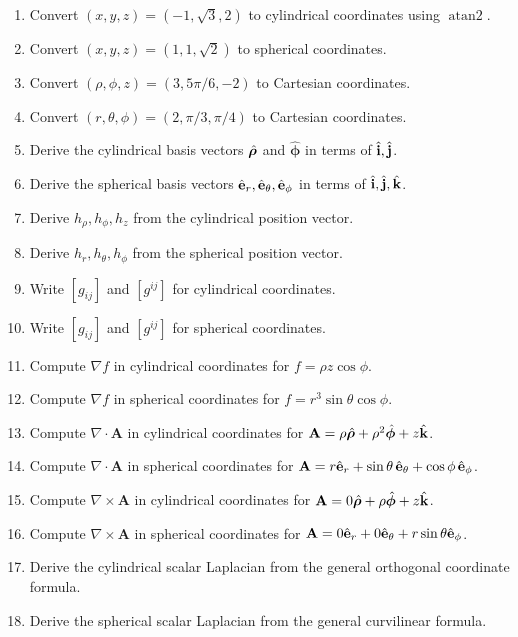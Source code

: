 \documentclass{otscience}
\begin{document}
\begin{practicebox}
\begin{enumerate}
\item Convert \((x,y,z)=(-1,\sqrt3,2)\) to cylindrical coordinates using \(\operatorname{atan2}\).
\item Convert \((x,y,z)=(1,1,\sqrt2)\) to spherical coordinates.
\item Convert \((\rho,\phi,z)=(3,5\pi/6,-2)\) to Cartesian coordinates.
\item Convert \((r,\theta,\phi)=(2,\pi/3,\pi/4)\) to Cartesian coordinates.
\item Derive the cylindrical basis vectors \(\hat{\boldsymbol{\rho}}\) and \(\hat{\boldsymbol{\phi}}\) in terms of \(\hat{\mathbf{i}},\hat{\mathbf{j}}\).
\item Derive the spherical basis vectors \(\hat{\mathbf{e}}_r,\hat{\mathbf{e}}_\theta,\hat{\mathbf{e}}_\phi\) in terms of \(\hat{\mathbf{i}},\hat{\mathbf{j}},\hat{\mathbf{k}}\).
\item Derive \(h_\rho,h_\phi,h_z\) from the cylindrical position vector.
\item Derive \(h_r,h_\theta,h_\phi\) from the spherical position vector.
\item Write \([g_{ij}]\) and \([g^{ij}]\) for cylindrical coordinates.
\item Write \([g_{ij}]\) and \([g^{ij}]\) for spherical coordinates.
\item Compute \(\nabla f\) in cylindrical coordinates for \(f=\rho z\cos\phi\).
\item Compute \(\nabla f\) in spherical coordinates for \(f=r^3\sin\theta\cos\phi\).
\item Compute \(\nabla\cdot\mathbf{A}\) in cylindrical coordinates for \(\mathbf{A}=\rho\hat{\boldsymbol{\rho}}+\rho^2\hat{\boldsymbol{\phi}}+z\hat{\mathbf{k}}\).
\item Compute \(\nabla\cdot\mathbf{A}\) in spherical coordinates for \(\mathbf{A}=r\hat{\mathbf{e}}_r+\sin\theta\,\hat{\mathbf{e}}_\theta+\cos\phi\,\hat{\mathbf{e}}_\phi\).
\item Compute \(\nabla\times\mathbf{A}\) in cylindrical coordinates for \(\mathbf{A}=0\hat{\boldsymbol{\rho}}+\rho\hat{\boldsymbol{\phi}}+z\hat{\mathbf{k}}\).
\item Compute \(\nabla\times\mathbf{A}\) in spherical coordinates for \(\mathbf{A}=0\hat{\mathbf{e}}_r+0\hat{\mathbf{e}}_\theta+r\sin\theta\hat{\mathbf{e}}_\phi\).
\item Derive the cylindrical scalar Laplacian from the general orthogonal coordinate formula.
\item Derive the spherical scalar Laplacian from the general curvilinear formula.
\end{enumerate}
\end{practicebox}
\end{document}
